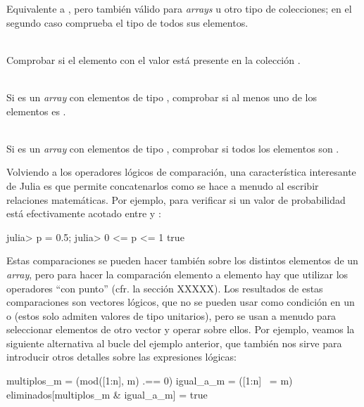 \begin{description}
  Equivalente a , pero también válido para \emph{arrays} u otro tipo de colecciones; en el segundo caso comprueba el tipo de todos sus elementos.
  \item[\code{in(el,x)}] \hfill \\
  Comprobar si el elemento con el valor  está presente en la colección .
  \item[\code{any(x)}] \hfill \\
  Si  es un \emph{array} con elementos de tipo , comprobar si al menos uno de los elementos es .
  \item[\code{all(x)}] \hfill \\
  Si  es un \emph{array} con elementos de tipo , comprobar si todos los elementos son .
\end{description}

Volviendo a los operadores lógicos de comparación, una característica interesante de Julia es que permite concatenarlos como se hace a menudo al escribir relaciones matemáticas. Por ejemplo, para verificar si un valor de probabilidad  está efectivamente acotado entre  y :

\begin{jlconcode}
julia> p = 0.5;
julia> 0 <= p <= 1
true
\end{jlconcode}

Estas comparaciones se pueden hacer también sobre los distintos elementos de un \emph{array}, pero para hacer la comparación elemento a elemento hay que utilizar los operadores ``con punto'' (cfr. la sección XXXXX). Los resultados de estas comparaciones son vectores lógicos, que no se pueden usar como condición en un  o  (estos solo admiten valores de tipo  unitarios), pero se usan a menudo para seleccionar elementos de otro vector y operar sobre ellos. Por ejemplo, veamos la siguiente alternativa al bucle  del ejemplo anterior, que también nos sirve para introducir otros detalles sobre las expresiones lógicas:

\begin{juliacode}
multiplos_m = (mod([1:n], m) .== 0)
igual_a_m = ([1:n] ~= m)
eliminados[multiplos_m & igual_a_m] = true
\end{juliacode}

